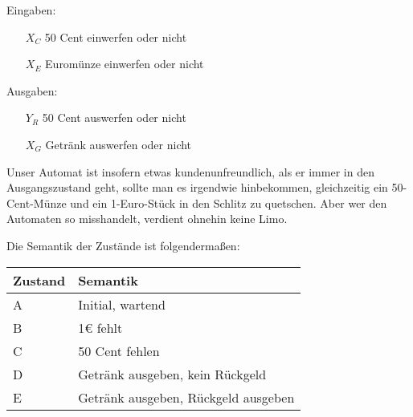 \documentclass{CInf_practice}
\begin{document}
\cinftitle


\noindent Eingaben:
\begin{enumerate}[align=left,leftmargin=\marginparwidth]
   \item[$X_C$] 50 Cent einwerfen oder nicht
   \item[$X_E$] Euromünze einwerfen oder nicht
\end{enumerate}
Ausgaben:
\begin{enumerate}[align=left,leftmargin=\marginparwidth]
   \item[$Y_R$] 50 Cent auswerfen oder nicht
   \item[$X_G$] Getränk auswerfen oder nicht
\end{enumerate}


Unser Automat ist insofern etwas kundenunfreundlich, als er immer in den
Ausgangszustand geht, sollte man es irgendwie hinbekommen, gleichzeitig ein
50-Cent-Münze und ein 1-Euro-Stück in den Schlitz zu quetschen. Aber wer den
Automaten so misshandelt, verdient ohnehin keine Limo.

\usetikzlibrary{automata,positioning,arrows.meta} %

Die Semantik der Zustände ist folgendermaßen:
\begin{center}
   \begin{tabular}{ll}
      \hline
      Zustand & Semantik \\\hline
      A & Initial, wartend \\
      B & 1\euro{} fehlt \\
      C & 50 Cent fehlen \\
      D & Getränk ausgeben, kein Rückgeld\\
      E & Getränk ausgeben, Rückgeld ausgeben\\
      \hline
   \end{tabular}
\end{center}
\end{document}
